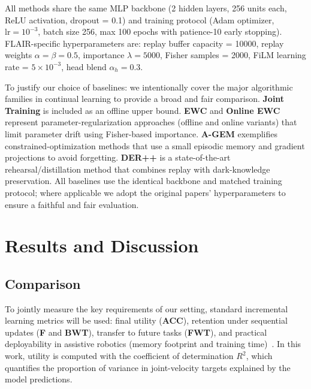 \documentclass[3p,times,procedia]{elsarticle}
\begin{document}
All methods share the same MLP backbone (2 hidden layers, 256 units each, ReLU activation, dropout = 0.1) and training protocol (Adam optimizer, $\text{lr} = 10^{-3}$, batch size 256, max 100 epochs with patience-10 early stopping). FLAIR-specific hyperparameters are: replay buffer capacity = 10000, replay weights $\alpha = \beta = 0.5$, importance $\lambda = 5000$, Fisher samples = 2000, FiLM learning rate = $5 \times 10^{-3}$, head blend $\alpha_h = 0.3$.

To justify our choice of baselines: we intentionally cover the major algorithmic families in continual learning to provide a broad and fair comparison. \textbf{Joint Training} is included as an offline upper bound. \textbf{EWC} and \textbf{Online EWC} represent parameter-regularization approaches (offline and online variants) that limit parameter drift using Fisher-based importance. \textbf{A-GEM} exemplifies constrained-optimization methods that use a small episodic memory and gradient projections to avoid forgetting. \textbf{DER++} is a state-of-the-art rehearsal/distillation method that combines replay with dark-knowledge preservation. All baselines use the identical backbone and matched training protocol; where applicable we adopt the original papers' hyperparameters to ensure a faithful and fair evaluation.

\section{Results and Discussion}
\label{sec:results_discussion}

\subsection{Comparison}

To jointly measure the key requirements of our setting, standard incremental learning metrics will be used: final utility (\textbf{ACC}), retention under sequential updates (\textbf{F} and \textbf{BWT}), transfer to future tasks (\textbf{FWT}), and practical deployability in assistive robotics (memory footprint and training time)~\cite{lopez2017gradient}. In this work, utility is computed with the coefficient of determination $R^2$, which quantifies the proportion of variance in joint-velocity targets explained by the model predictions.%
\end{document}
